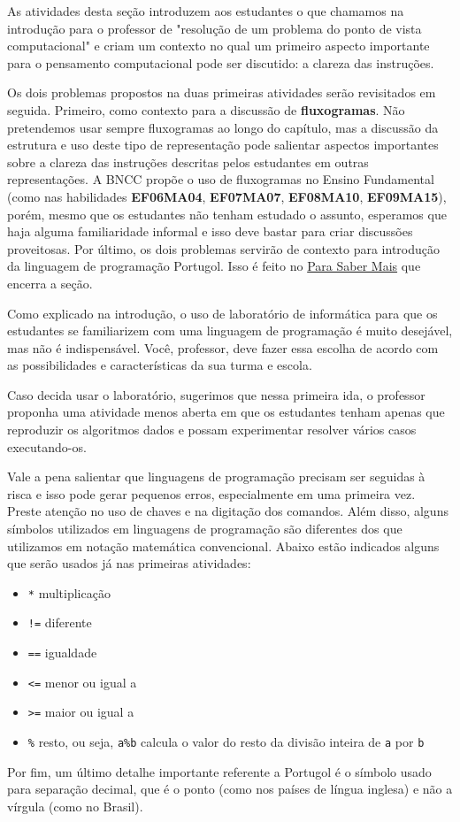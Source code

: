 \begin{texto}
{\small
As atividades desta seção introduzem aos estudantes o que chamamos na introdução para o professor de "resolução de um problema do ponto de vista computacional"{} e criam um contexto no qual um primeiro aspecto importante para o pensamento computacional pode ser discutido: a clareza das instruções.

Os dois problemas propostos na duas primeiras atividades serão revisitados em seguida. Primeiro, como contexto para a discussão de \textbf{fluxogramas}. Não pretendemos usar sempre fluxogramas ao longo do capítulo, mas a discussão da estrutura e uso deste tipo de representação pode salientar aspectos importantes sobre a clareza das instruções descritas pelos estudantes em outras representações. A BNCC propõe o uso de fluxogramas no Ensino Fundamental (como nas habilidades \textbf{EF06MA04}, \textbf{EF07MA07}, \textbf{EF08MA10}, \textbf{EF09MA15}), porém, mesmo que os estudantes não tenham estudado o assunto, esperamos que haja alguma familiaridade informal e isso deve bastar para criar discussões proveitosas. Por último, os dois problemas servirão de contexto para introdução da linguagem de programação Portugol. Isso é feito no \hyperref[comp-know1]{Para Saber Mais} que encerra a seção.

Como explicado na introdução, o uso de laboratório de informática para que os estudantes se familiarizem com uma linguagem de programação é muito desejável, mas não é indispensável. Você, professor, deve fazer essa escolha de acordo com as possibilidades e características da sua turma e escola.

Caso decida usar o laboratório, sugerimos que nessa primeira ida, o professor proponha uma atividade menos aberta em que os estudantes tenham apenas que reproduzir os algoritmos dados e possam experimentar resolver vários casos executando-os.

Vale a pena salientar que linguagens de programação precisam ser seguidas à risca e isso pode gerar pequenos erros, especialmente em uma primeira vez. Preste atenção no uso de chaves e na digitação dos comandos. Além disso, alguns símbolos utilizados em linguagens de programação são diferentes dos que utilizamos em notação matemática convencional. Abaixo estão indicados alguns que serão usados já nas primeiras atividades:

\begin{itemize}
\item \texttt{*} multiplicação
\item \texttt{!=} diferente
\item \texttt{==} igualdade
\item \texttt{<=} menor ou igual a
\item \texttt{>=} maior ou igual a
\item \texttt{\%} resto, ou seja, \texttt{a\%b} calcula o valor do resto da divisão inteira de \texttt{a} por \texttt{b}
\end{itemize}

Por fim, um último detalhe importante referente a Portugol é o símbolo usado para separação decimal, que é o ponto (como nos países de língua inglesa) e não a vírgula (como no Brasil).
}
\end{texto}
